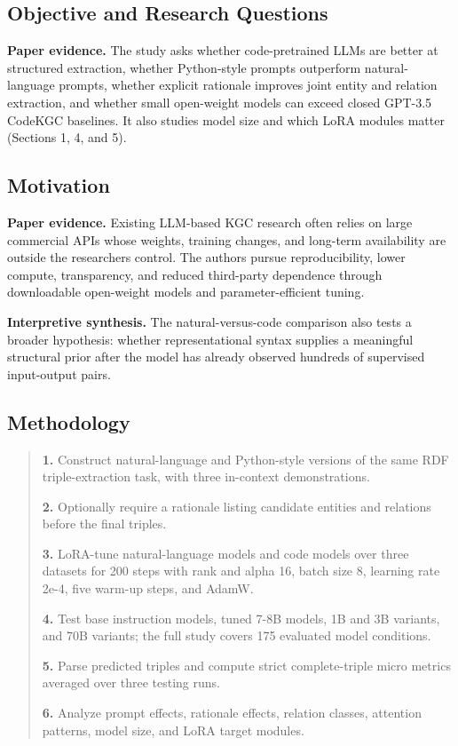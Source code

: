 \documentclass[11pt]{article}
\begin{document}
\subsection{Objective and Research
Questions}\label{objective-and-research-questions-1}

\textbf{Paper evidence.} The study asks whether code-pretrained LLMs are better at
structured extraction, whether Python-style prompts outperform
natural-language prompts, whether explicit rationale improves joint
entity and relation extraction, and whether small open-weight models can
exceed closed GPT-3.5 CodeKGC baselines. It also studies model size and
which LoRA modules matter (Sections 1, 4, and 5).

\subsection{Motivation}\label{motivation-1}

\textbf{Paper evidence.} Existing LLM-based KGC research often relies on large
commercial APIs whose weights, training changes, and long-term
availability are outside the researcher\textquotesingle s control. The
authors pursue reproducibility, lower compute, transparency, and reduced
third-party dependence through downloadable open-weight models and
parameter-efficient tuning.

\textbf{Interpretive synthesis.} The natural-versus-code comparison also tests a broader
hypothesis: whether representational syntax supplies a meaningful
structural prior after the model has already observed hundreds of
supervised input-output pairs.

\subsection{Methodology}\label{methodology-3}

\begin{quote}
\textbf{1.} Construct natural-language and Python-style versions of the
same RDF triple-extraction task, with three in-context demonstrations.

\textbf{2.} Optionally require a rationale listing candidate entities
and relations before the final triples.

\textbf{3.} LoRA-tune natural-language models and code models over three
datasets for 200 steps with rank and alpha 16, batch size 8, learning
rate 2e-4, five warm-up steps, and AdamW.

\textbf{4.} Test base instruction models, tuned 7-8B models, 1B and 3B
variants, and 70B variants; the full study covers 175 evaluated model
conditions.

\textbf{5.} Parse predicted triples and compute strict complete-triple
micro metrics averaged over three testing runs.

\textbf{6.} Analyze prompt effects, rationale effects, relation classes,
attention patterns, model size, and LoRA target modules.
\end{quote}
\end{document}
